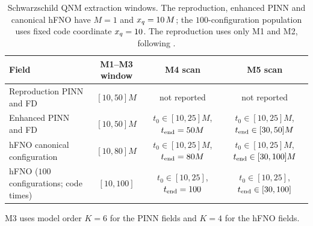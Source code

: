 \begin{table}[!htbp]
\centering
\caption{Schwarzschild QNM extraction windows. The reproduction,
enhanced PINN and canonical hFNO have $M=1$ and $x_{q}=10\,M$; the
$100$-configuration population uses fixed code coordinate $x_{q}=10$.
The reproduction uses only M1 and M2, following \citet{Patel2024pinn}.}
\label{tab:qnm-windows}
\footnotesize
\setlength{\tabcolsep}{3pt}
\begin{tabular*}{\textwidth}{@{\extracolsep{\fill}}lccc@{}}
\toprule
Field & M1--M3 window & M4 scan & M5 scan \\
\midrule
Reproduction PINN and FD
 & $[10,50]M$ & not reported & not reported \\
Enhanced PINN and FD
 & $[10,50]M$ & $t_0\in[10,25]M$, $t_{\mathrm{end}}=50M$
 & $t_0\in[10,25]M$, $t_{\mathrm{end}}\in[30,50]M$ \\
hFNO canonical configuration
 & $[10,80]M$ & $t_0\in[10,25]M$, $t_{\mathrm{end}}=80M$
 & $t_0\in[10,25]M$, $t_{\mathrm{end}}\in[30,100]M$ \\
hFNO ($100$ configurations; code times)
 & $[10,100]$ & $t_0\in[10,25]$, $t_{\mathrm{end}}=100$
 & $t_0\in[10,25]$, $t_{\mathrm{end}}\in[30,100]$ \\
\bottomrule
\end{tabular*}
\end{table}

M3 uses model order $K=6$ for the PINN fields and $K=4$ for the hFNO
fields.


